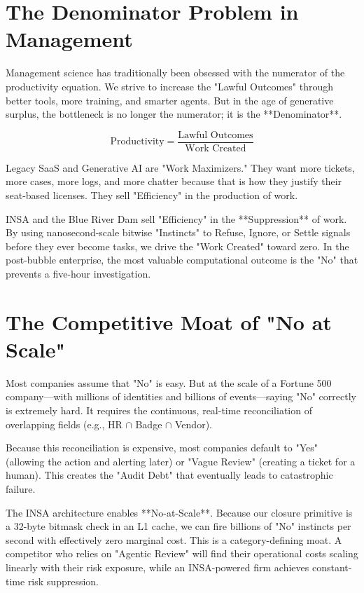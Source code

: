 \documentclass[12pt,a4paper,oneside]{book}
\begin{document}
\section{The Denominator Problem in Management}
Management science has traditionally been obsessed with the numerator of the productivity equation. We strive to increase the "Lawful Outcomes" through better tools, more training, and smarter agents. But in the age of generative surplus, the bottleneck is no longer the numerator; it is the **Denominator**. 

\begin{equation}
\text{Productivity} = \frac{\text{Lawful Outcomes}}{\text{Work Created}}
\end{equation}

Legacy SaaS and Generative AI are "Work Maximizers." They want more tickets, more cases, more logs, and more chatter because that is how they justify their seat-based licenses. They sell "Efficiency" in the production of work. 

INSA and the Blue River Dam sell "Efficiency" in the **Suppression** of work. By using nanosecond-scale bitwise "Instincts" to Refuse, Ignore, or Settle signals before they ever become tasks, we drive the "Work Created" toward zero. In the post-bubble enterprise, the most valuable computational outcome is the "No" that prevents a five-hour investigation.

\section{The Competitive Moat of "No at Scale"}
Most companies assume that "No" is easy. But at the scale of a Fortune 500 company—with millions of identities and billions of events—saying "No" correctly is extremely hard. It requires the continuous, real-time reconciliation of overlapping fields (e.g., HR $\cap$ Badge $\cap$ Vendor). 

Because this reconciliation is expensive, most companies default to "Yes" (allowing the action and alerting later) or "Vague Review" (creating a ticket for a human). This creates the "Audit Debt" that eventually leads to catastrophic failure. 

The INSA architecture enables **No-at-Scale**. Because our closure primitive is a 32-byte bitmask check in an L1 cache, we can fire billions of "No" instincts per second with effectively zero marginal cost. This is a category-defining moat. A competitor who relies on "Agentic Review" will find their operational costs scaling linearly with their risk exposure, while an INSA-powered firm achieves constant-time risk suppression.
\end{document}
